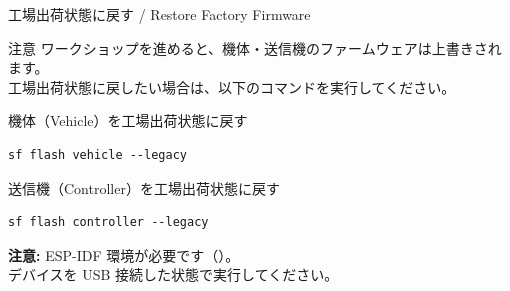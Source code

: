 \begin{frame}[fragile]{工場出荷状態に戻す / Restore Factory Firmware}
  \begin{alertblock}{注意}
    {\small ワークショップを進めると、機体・送信機のファームウェアは上書きされます。\\
    工場出荷状態に戻したい場合は、以下のコマンドを実行してください。}
  \end{alertblock}

  \vspace{-0.2em}

  \begin{block}{機体（Vehicle）を工場出荷状態に戻す}
  \begin{lstlisting}[style=sfcpp]
sf flash vehicle --legacy
  \end{lstlisting}
  \end{block}

  \vspace{-0.3em}

  \begin{block}{送信機（Controller）を工場出荷状態に戻す}
  \begin{lstlisting}[style=sfcpp]
sf flash controller --legacy
  \end{lstlisting}
  \end{block}

  \vspace{-0.2em}

  {\scriptsize
  \textbf{注意:} ESP-IDF 環境が必要です（）。\\
  デバイスを USB 接続した状態で実行してください。
  }
\end{frame}

